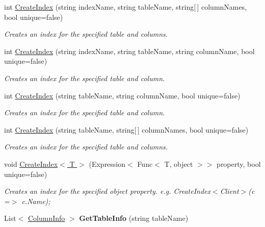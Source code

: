 \begin{DoxyCompactItemize}
int \hyperlink{classSQLite_1_1SQLiteConnection_a006cda01a29a2f202be1659cbf3810a8}{Create\-Index} (string index\-Name, string table\-Name, string\mbox{[}$\,$\mbox{]} column\-Names, bool unique=false)
\begin{DoxyCompactList}\small\item\em Creates an index for the specified table and columns. \end{DoxyCompactList}\item 
int \hyperlink{classSQLite_1_1SQLiteConnection_a41bc451f0fed96a6cb79ae2d61ab3a11}{Create\-Index} (string index\-Name, string table\-Name, string column\-Name, bool unique=false)
\begin{DoxyCompactList}\small\item\em Creates an index for the specified table and column. \end{DoxyCompactList}\item 
int \hyperlink{classSQLite_1_1SQLiteConnection_a91adc40b863214a5efc495b33ec9a351}{Create\-Index} (string table\-Name, string column\-Name, bool unique=false)
\begin{DoxyCompactList}\small\item\em Creates an index for the specified table and column. \end{DoxyCompactList}\item 
int \hyperlink{classSQLite_1_1SQLiteConnection_a30996f7f4a91d17d719ef4dd582b4cee}{Create\-Index} (string table\-Name, string\mbox{[}$\,$\mbox{]} column\-Names, bool unique=false)
\begin{DoxyCompactList}\small\item\em Creates an index for the specified table and columns. \end{DoxyCompactList}\item 
void \hyperlink{classSQLite_1_1SQLiteConnection_a7283c295b89b54728d7201e0812ccaac}{Create\-Index$<$ T $>$} (Expression$<$ Func$<$ T, object $>$$>$ property, bool unique=false)
\begin{DoxyCompactList}\small\item\em Creates an index for the specified object property. e.\-g. Create\-Index$<$\-Client$>$(c =$>$ c.\-Name); \end{DoxyCompactList}\item 
\hypertarget{classSQLite_1_1SQLiteConnection_a695bad5670f4d38a9aae39e4aec85329}{List$<$ \hyperlink{classSQLite_1_1SQLiteConnection_1_1ColumnInfo}{Column\-Info} $>$ {\bfseries Get\-Table\-Info} (string table\-Name)}\label{classSQLite_1_1SQLiteConnection_a695bad5670f4d38a9aae39e4aec85329}


\end{DoxyCompactItemize}
